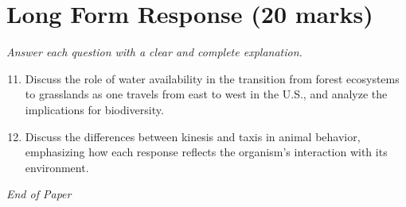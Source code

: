 \documentclass[12pt]{article}
\begin{document}
\section*{Long Form Response (20 marks)}
\textit{Answer each question with a clear and complete explanation.}
\begin{enumerate}[label=\arabic*.]
\setcounter{enumi}{10}
\item Discuss the role of water availability in the transition from forest ecosystems to grasslands as one travels from east to west in the U.S., and analyze the implications for biodiversity.
\item Discuss the differences between kinesis and taxis in animal behavior, emphasizing how each response reflects the organism's interaction with its environment.
\end{enumerate}

\vfill
\noindent\textit{End of Paper}
\end{document}
